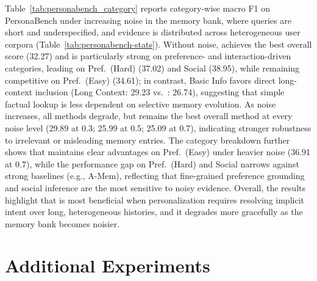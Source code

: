 Table~\ref{tab:personabench_category} reports category-wise macro F1 on PersonaBench under increasing noise in the memory bank, where queries are short and underspecified, and evidence is distributed across heterogeneous user corpora (Table~\ref{tab:personabench-stats}). Without noise, \ourmodel achieves the best overall score (32.27) and is particularly strong on preference- and interaction-driven categories, leading on Pref.\ (Hard) (37.02) and Social (38.95), while remaining competitive on Pref.\ (Easy) (34.61); in contrast, Basic Info favors direct long-context inclusion (Long Context: 29.23 vs.\ \ourmodel: 26.74), suggesting that simple factual lookup is less dependent on selective memory evolution. As noise increases, all methods degrade, but \ourmodel remains the best overall method at every noise level (29.89 at 0.3; 25.99 at 0.5; 25.09 at 0.7), indicating stronger robustness to irrelevant or misleading memory entries. The category breakdown further shows that \ourmodel maintains clear advantages on Pref.\ (Easy) under heavier noise (36.91 at 0.7), while the performance gap on Pref.\ (Hard) and Social narrows against strong baselines (e.g., A-Mem), reflecting that fine-grained preference grounding and social inference are the most sensitive to noisy evidence. Overall, the results highlight that \ourmodel is most beneficial when personalization requires resolving implicit intent over long, heterogeneous histories, and it degrades more gracefully as the memory bank becomes noisier.


\section{Additional Experiments}

